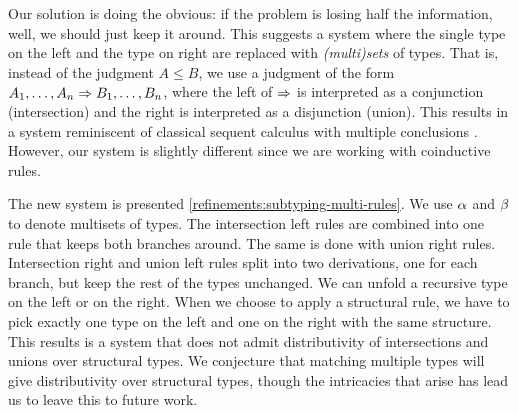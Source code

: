Our solution is doing the obvious: if the problem is losing half the information, well, we should just keep it around. This suggests a system where the single type on the left and the type on right are replaced with \emph{(multi)sets} of types. That is, instead of the judgment $A \le B$, we use a judgment of the form $A_1, \ldots, A_n \mathrel\Rightarrow B_1, \ldots, B_n$, where the left of $\mathrel\Rightarrow$ is interpreted as a conjunction (intersection) and the right is interpreted as a disjunction (union). This results in a system reminiscent of classical sequent calculus with multiple conclusions \cite{Gentzen35, Girard87}. However, our system is slightly different since we are working with coinductive rules.

The new system is presented \cref{refinements:subtyping-multi-rules}. We use $\alpha$ and $\beta$ to denote multisets of types. The intersection left rules are combined into one rule that keeps both branches around. The same is done with union right rules. Intersection right and union left rules split into two derivations, one for each branch, but keep the rest of the types unchanged. We can unfold a recursive type on the left or on the right. When we choose to apply a structural rule, we have to pick exactly one type on the left and one on the right with the same structure. This results is a system that does not admit distributivity of intersections and unions over structural types. We conjecture that matching multiple types will give distributivity over structural types, though the intricacies that arise has lead us to leave this to future work.


